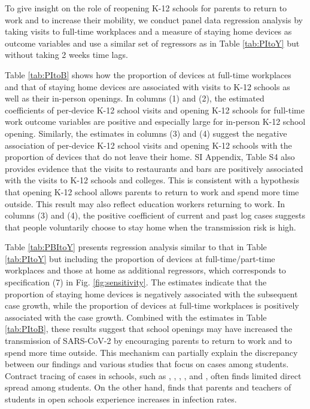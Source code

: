 \documentclass[9pt,twocolumn,twoside,lineno]{pnas-new}
\begin{document}
To give insight on the role of reopening K-12 schools for parents to return to work and to increase their mobility, we conduct panel data regression analysis by taking visits to full-time workplaces and a measure of staying home devices as outcome variables and use a similar set of regressors as in Table \ref{tab:PItoY} but without taking 2 weeks time lags.

Table \ref{tab:PItoB} shows how the proportion of devices at full-time workplaces and that of staying home devices are associated with visits to  K-12 schools as well as their in-person openings. In columns (1) and (2), the estimated coefficients of per-device K-12 school visits and opening K-12 schools for full-time work outcome variables are positive and especially large for in-person K-12 school opening. Similarly, the estimates in columns (3) and (4) suggest the negative association of per-device K-12 school visits and opening K-12 schools with the proportion of devices that do not leave their home. SI Appendix, Table S4 also provides evidence that the visits to restaurants and bars are positively associated with the visits to  K-12 schools and colleges. This is consistent with a hypothesis that opening K-12 school allows parents to return to work and spend more time outside. This result may also reflect education workers returning to work. In columns (3) and (4), the positive coefficient of current and past log cases suggests that people voluntarily choose to stay home when the transmission risk is high.

Table \ref{tab:PBItoY}  presents regression analysis similar to that in Table \ref{tab:PItoY} but including the proportion of devices at full-time/part-time workplaces and those at home as additional regressors, which corresponds to specification (7) in Fig. \ref{fig:sensitivity}. The estimates indicate that the proportion of staying home devices is negatively associated with the subsequent case growth, while the proportion of devices at full-time workplaces is positively associated with the case growth. Combined with the estimates in Table \ref{tab:PItoB}, these results suggest that school openings may have increased the transmission of SARS-CoV-2 by encouraging parents to return to work and to spend more time outside. This mechanism can partially explain the discrepancy between our findings and various studies that focus on cases among students. Contract tracing of cases in schools, such as \cite{falk2021}, \cite{zimmerman2020}, \cite{willeit2021}, \cite{brandal2021}, and \cite{ismail2020}, often finds limited direct spread among students. On the other hand, \cite{vlachos2021} finds that parents and teachers of students in open schools experience increases in infection rates.
\end{document}
